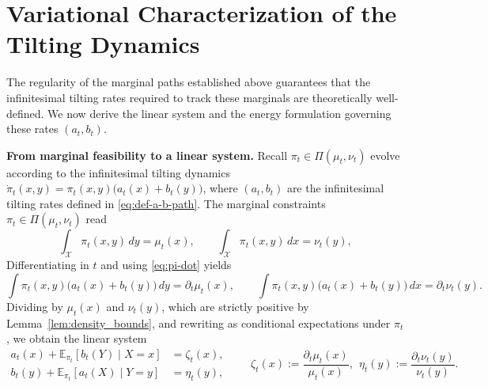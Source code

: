 \documentclass[11pt]{article}
\theoremstyle{definition}
\numberwithin{equation}{section}%
\begin{document}
{%

\section{Variational Characterization of the Tilting Dynamics}
\label{app:energy-derivation}
The regularity of the marginal paths established above guarantees that the infinitesimal tilting rates required to track these marginals are theoretically well-defined. We now derive the linear system and the energy formulation governing these rates $(a_t, b_t)$.

\smallskip
\noindent
\textbf{From marginal feasibility to a linear system.} Recall $\pi_t\in\Pi(\mu_t,\nu_t)$ evolve according to the infinitesimal tilting dynamics $\dot\pi_t(x,y)=\pi_t(x,y)\big(a_t(x)+b_t(y)\big)$, where $(a_t,b_t)$ are the infinitesimal tilting rates defined in \eqref{eq:def-a-b-path}.
The marginal constraints $\pi_t\in\Pi(\mu_t,\nu_t)$ read
\[
\int_{\mathcal X} \pi_t(x,y)\,dy= \mu_t(x),
\qquad
\int_{\mathcal X} \pi_t(x,y)\,dx= \nu_t(y),
\]
Differentiating in $t$ and using
\eqref{eq:pi-dot} yields
\[
\int \pi_t(x,y)\big(a_t(x)+b_t(y)\big)\,dy= \partial_t \mu_t(x),
\qquad
\int \pi_t(x,y)\big(a_t(x)+b_t(y)\big)\,dx= \partial_t \nu_t(y).
\]
Dividing by $\mu_t(x)$ and $\nu_t(y)$, which are strictly positive by Lemma~\ref{lem:density_bounds}, and rewriting as conditional expectations under $\pi_t$,
we obtain the linear system
\begin{equation}
\label{eq:app_linear_system_ab}
\boxed{
\begin{aligned}
a_t(x)+\mathbb{E}_{\pi_t}\!\left[b_t(Y)\mid X=x\right] &= \zeta_t(x),\\
b_t(y)+\mathbb{E}_{\pi_t}\!\left[a_t(X)\mid Y=y\right] &= \eta_t(y),
\end{aligned}}
\qquad
\zeta_t(x):=\frac{\partial_t \mu_t(x)}{\mu_t(x)},\ \ \eta_t(y):=\frac{\partial_t \nu_t(y)}{\nu_t(y)}.
\end{equation}

}
\end{document}
